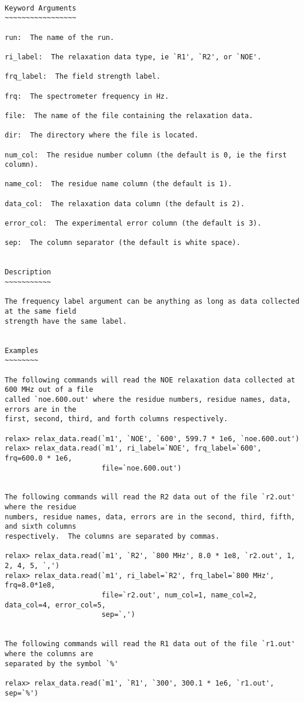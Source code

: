 {\scriptsize
\begin{verbatim}

Keyword Arguments
~~~~~~~~~~~~~~~~~

run:  The name of the run.

ri_label:  The relaxation data type, ie `R1', `R2', or `NOE'.

frq_label:  The field strength label.

frq:  The spectrometer frequency in Hz.

file:  The name of the file containing the relaxation data.

dir:  The directory where the file is located.

num_col:  The residue number column (the default is 0, ie the first column).

name_col:  The residue name column (the default is 1).

data_col:  The relaxation data column (the default is 2).

error_col:  The experimental error column (the default is 3).

sep:  The column separator (the default is white space).


Description
~~~~~~~~~~~

The frequency label argument can be anything as long as data collected at the same field
strength have the same label.


Examples
~~~~~~~~

The following commands will read the NOE relaxation data collected at 600 MHz out of a file
called `noe.600.out' where the residue numbers, residue names, data, errors are in the
first, second, third, and forth columns respectively.

relax> relax_data.read(`m1', `NOE', `600', 599.7 * 1e6, `noe.600.out')
relax> relax_data.read(`m1', ri_label=`NOE', frq_label=`600', frq=600.0 * 1e6,
                       file=`noe.600.out')


The following commands will read the R2 data out of the file `r2.out' where the residue
numbers, residue names, data, errors are in the second, third, fifth, and sixth columns
respectively.  The columns are separated by commas.

relax> relax_data.read(`m1', `R2', `800 MHz', 8.0 * 1e8, `r2.out', 1, 2, 4, 5, `,')
relax> relax_data.read(`m1', ri_label=`R2', frq_label=`800 MHz', frq=8.0*1e8,
                       file=`r2.out', num_col=1, name_col=2, data_col=4, error_col=5,
                       sep=`,')


The following commands will read the R1 data out of the file `r1.out' where the columns are
separated by the symbol `%'

relax> relax_data.read(`m1', `R1', `300', 300.1 * 1e6, `r1.out', sep=`%')
\end{verbatim}
}



